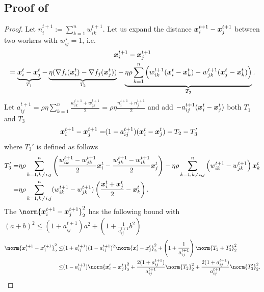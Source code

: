 \documentclass{article}
\begin{document}
 \subsection{Proof of }\label{ssec:proof:consensus-distance:2}
 \begin{proof}
  Let $n_{i}^{t+1}:=\sum_{k=1}^n w_{ik}^{t+1}$.
  Let us expand the distance $\bm{x}_i^{t+1} - \bm{x}_j^{t+1}$ between two workers with $w_{ij}^\star=1$, i.e.
  \begin{multline*}
    \bm{x}_i^{t+1} - \bm{x}_j^{t+1} \\
    =\underbrace{\bm{x}_i^t - \bm{x}_j^t}_{T_1} - \underbrace{\eta(\nabla f_i(\bm{x}_i^t) - \nabla f_j(\bm{x}_j^t))}_{T_2} -\underbrace{\eta\rho \sum_{k=1}^n \left(w_{ik}^{t+1} (\bm{x}_i^t - \bm{x}_k^t) - w_{jk}^{t+1} (\bm{x}_j^t - \bm{x}_k^t) \right)}_{T_3}.
  \end{multline*}
  Let $a_{ij}^{t+1}=\rho\eta \sum_{k=1}^n \frac{w_{ik}^{t+1}+w_{jk}^{t+1}}{2}=\rho\eta\frac{n_i^{t+1}+n_j^{t+1}}{2}$ and add $- a_{ij}^{t+1} (\bm{x}_i^t-\bm{x}_j^t)$ both $T_1$ and $T_3$
  \begin{align*}
    \bm{x}_i^{t+1} - \bm{x}_j^{t+1}=&
    (1-a_{ij}^{t+1})(\bm{x}_i^t-\bm{x}_j^t) - T_2 - T_3'
  \end{align*}
  where $T_3'$ is defined as follows
  \begin{align*}
    T_3'=&\eta\rho\sum_{k=1,k\neq i,j}^n \left( \frac{w_{ik}^{t+1}-w_{jk}^{t+1}}{2} \bm{x}_i^t - 
    \frac{w_{jk}^{t+1}-w_{ik}^{t+1}}{2} \bm{x}_j^t \right) - \eta\rho\sum_{k=1,k\neq i,j}^n \left( w_{ik}^{t+1}-w_{jk}^{t+1} \right)\bm{x}_k^t \\
    =& \eta\rho\sum_{k=1,k\neq i,j}^n (w_{ik}^{t+1}-w_{jk}^{t+1}) \left( \frac{\bm{x}_i^t+\bm{x}_j^t}{2}  - 
    \bm{x}_k^t \right).
  \end{align*}
  The $\norm{\xx_i^{t+1} - \xx_j^{t+1}}_2^2$ has the following bound with $(a+b)^2\le(1+a_{ij}^{t+1})a^2 + (1+\frac{1}{a_{ij}^{t+1}}b^2)$
  \begin{equation}\label{eq:consensus-distance:1}
    \begin{split}      
      \norm{\xx_i^{t+1} - \xx_j^{t+1}}_2^2
    \le& (1+a_{ij}^{t+1}) (1-a_{ij}^{t+1})^2 \norm{\xx_i^t-\xx_j^t}_2^2 + \left(1+\frac{1}{a_{ij}^{t+1}}\right) \norm{T_2+T_3'}_2^2 \\
    \le& (1-a_{ij}^{t+1}) \norm{\xx_i^t-\xx_j^t}_2^2 
    +  \frac{2(1+a_{ij}^{t+1})}{a_{ij}^{t+1}} \norm{T_2}_2^2 
    +  \frac{2(1+a_{ij}^{t+1})}{a_{ij}^{t+1}}\norm{T_3'}_2^2.
    \end{split}
  \end{equation} 

\end{proof}
\end{document}
